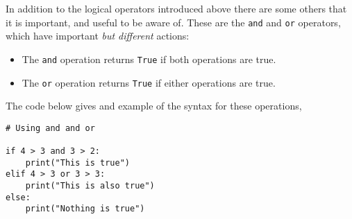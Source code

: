 \documentclass[a4paper]{article}
\begin{document}
In addition to the logical operators introduced above there are some others that it is important, and useful to be aware of. 
These are the \texttt{and} and \texttt{or} operators, which have important \emph{but different} actions:
\begin{itemize}
	\item{The \texttt{and} operation returns \texttt{True} if both operations are true.}
	\item{The \texttt{or} operation returns \texttt{True} if either operations are true.}
\end{itemize}
The code below gives and example of the syntax for these operations, 
\begin{lstlisting}
# Using and and or

if 4 > 3 and 3 > 2:
	print("This is true")
elif 4 > 3 or 3 > 3:
	print("This is also true")
else:
	print("Nothing is true")
\end{lstlisting}
\vspace{\baselineskip}
\begin{center}
	\noindent{}
\end{center}


%
%
\end{document}
